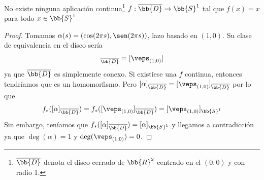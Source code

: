 \begin{prop}\label{prop1-12}
    No existe ninguna aplicación continua\footnote{$\overline{\bb{D}}$ denota el disco cerrado de $\bb{R}^2$ centrado en el $(0,0)$ y con radio 1.} $f : \overline{\bb{D}} \to \bb{S}^1$ tal que $f(x) = x$ para todo $x\in \bb{S}^1$

    \begin{proof}
        Tomamos $\alpha (s) = (\cos(2\pi s), \sen(2\pi s))$, lazo basado en $(1,0)$. Su clase de equivalencia en el disco sería 
        \begin{gather*}
            [\alpha]_{\overline{\bb{D}}} = [\veps_{(1,0)}]
        \end{gather*}
        ya que $\overline{\bb{D}}$ es simplemente conexo. Si existiese una $f$ continua, entonces tendríamos que
        es un homomorfismo. Pero $[\alpha]_{\overline{\bb{D}}} = [\veps_{(1,0)}]_{\overline{\bb{D}}}$ por lo que 
        \begin{gather*}
            f_*([\alpha]_{\overline{\bb{D}}}) = f_*([\veps_{(1,0)}]_{\overline{\bb{D}}}) = [\veps_{(1,0)}]_{\bb{S}^1}
        \end{gather*}
        Sin embargo, teníamos que $f_*([\alpha]_{\overline{\bb{D}}}) = [\alpha]_{\bb{S}^1}$ y llegamos a contradicción ya que $\deg(\alpha) = 1$ y $\deg(\veps_{(1,0)}) = 0$.
    \end{proof}
\end{prop}

